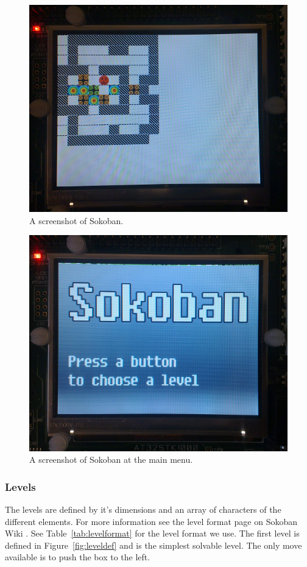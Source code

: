 \documentclass[a4paper,11pt]{article}
\begin{document}
\begin{figure}[H]
\centering
\includegraphics[scale=0.6]{images/sokobanscreen.png}
\caption{A screenshot of Sokoban.}
\label{fig:sokobanscreen}
\end{figure}

\begin{figure}[H]
\centering
\includegraphics[scale=0.6]{images/sokobanmainmenu.png}
\caption{A screenshot of Sokoban at the main menu.}
\label{fig:sokobanmainmenu}
\end{figure}


\subsubsection{Levels}
The levels are defined by it's dimensions and an array of characters of the different elements. For more information see the level format page on Sokoban Wiki \cite{sokobanlevel}. See Table~\ref{tab:levelformat} for the level format we use. The first level is defined in Figure~\ref{fig:leveldef} and is the simplest solvable level. The only move available is to push the box to the left.
\end{document}
